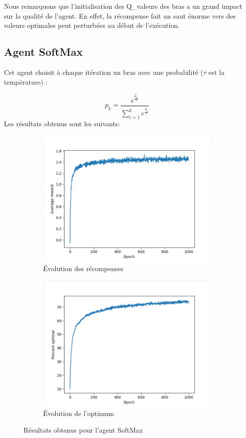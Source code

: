 \documentclass[a4paper,english,12pt]{article}
\begin{document}
Nous remarquons que l'initialisation des Q\_valeurs des bras a un grand impact sur la qualité de l'agent. En effet, la récompense fait un saut énorme vers des valeurs optimales peut perturbées au début de l'exécution. 

\subsection{Agent SoftMax}

\vspace{-0.5em}
Cet agent choisit à chaque itération un bras avec une probabilité ($\tau$ est la température) :

\vspace{-1.5em}
$$
p_k=\frac{e^{\frac{\hat{\mu}_k}{\tau}}}{\sum_{i=1}^{k}e^{\frac{\hat{\mu}_i}{\tau}}}
$$
Les résultats obtenus sont les suivants:
\begin{figure}[H]
	\centering
	\begin{subfigure}{0.48\textwidth}
		\includegraphics[width=\textwidth]{soft_reward}
		\caption{Évolution des récompenses}
	\end{subfigure}
	\begin{subfigure}{0.48\textwidth}
		\includegraphics[width=\textwidth]{soft_optimal}
		\caption{Évolution de l'optimum}
	\end{subfigure}
	\caption{Résultats obtenus pour l'agent SoftMax}
\end{figure}
\end{document}
